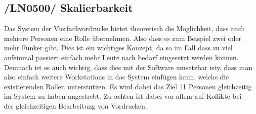 \subsection{/LN0500/ Skalierbarkeit}
Das System der Vierfachvordrucke bietet theoretisch die Möglichkeit, dass auch mehrere Personen eine Rolle übernehmen. Also dass es zum Beispiel zwei oder mehr Funker gibt. Dies ist ein wichtiges Konzept, da so im Fall dass zu viel aufeinmal passiert einfach mehr Leute nach bedarf eingesetzt werden können. Demnach ist es auch wichtig, dass dies mit der Software umsetzbar isty, dass man also einfach weitere Workstations in das System einfügen kann, welche die existierenden Rollen unterstützen. Es wird dabei das Ziel 11 Personen gleichzeitig im System zu haben angestrebt. 
Zu achten ist dabei vor allem auf Koflikte bei der gleichzeitigen Bearbeitung von Vordrucken.